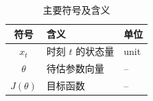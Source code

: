 \begin{table}[htbp]
  \centering
  \caption{主要符号及含义}
  \begin{tabular}{cll}
    \toprule
    符号 & 含义 & 单位 \\
    \midrule
    $x_t$ & 时刻 $t$ 的状态量 & \unit{unit} \\
    $\theta$ & 待估参数向量 & -- \\
    $J(\theta)$ & 目标函数 & -- \\
    \bottomrule
  \end{tabular}
\end{table}
